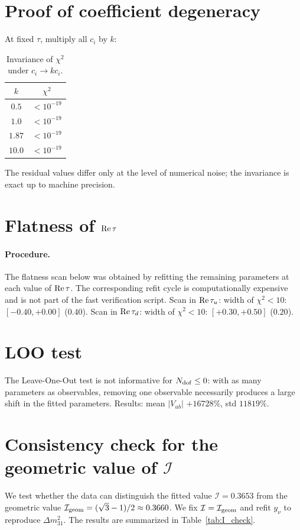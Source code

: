 \documentclass[12pt,a4paper]{article}
\numberwithin{equation}{section}
\begin{document}
\section{Proof of coefficient degeneracy}
At fixed \(\tau\), multiply all \(c_i\) by \(k\):
\begin{table}[H]
\centering
\caption{Invariance of \(\chi^2\) under \(c_i\to kc_i\).}
\begin{tabular}{cc}
\toprule
\(k\) & \(\chi^2\) \\
\midrule
\(0.5\)  & \(< 10^{-19}\) \\
\(1.0\)  & \(< 10^{-19}\) \\
\(1.87\) & \(< 10^{-19}\) \\
\(10.0\) & \(< 10^{-19}\) \\
\bottomrule
\end{tabular}
\end{table}
The residual values differ only at the level of numerical noise; the invariance is exact up to machine precision.

\section{Flatness of \({\rm Re}\,\tau\)}
\paragraph{Procedure.}
The flatness scan below was obtained by refitting the remaining parameters at each value of \({\rm Re}\,\tau\). The corresponding refit cycle is computationally expensive and is not part of the fast verification script.
Scan in \({\rm Re}\,\tau_u\): width of \(\chi^2<10\): \([-0.40, +0.00]\) (\(0.40\)). Scan in \({\rm Re}\,\tau_d\): width of \(\chi^2<10\): \([+0.30, +0.50]\) (\(0.20\)).

\section{LOO test}
The Leave-One-Out test is not informative for \(N_{\rm dof} \le 0\): with as many parameters as observables, removing one observable necessarily produces a large shift in the fitted parameters. Results: mean \(|V_{ub}|\) \(+16728\%\), std \(11819\%\).

\section{Consistency check for the geometric value of \(\mathcal I\)}
\label{app:I_check}
We test whether the data can distinguish the fitted value \(\mathcal I = 0.3653\) from the geometric value \(\mathcal I_{\rm geom} = (\sqrt{3}-1)/2 \approx 0.3660\). We fix \(\mathcal I = \mathcal I_{\rm geom}\) and refit \(y_\nu\) to reproduce \(\Delta m^2_{31}\). The results are summarized in Table~\ref{tab:I_check}.
\end{document}
